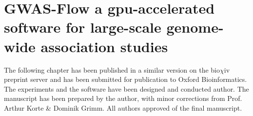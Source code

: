 
\chapter{GWAS-Flow a gpu-accelerated software for large-scale genome-wide association studies}

\label{Chapter3} %


The following chapter has been published in a similar version on the bio$\chi$iv preprint server
\cite{Freudenthal_2019} and has been submitted for publication to Oxford Bioinformatics. The experiments and
the software have been designed and conducted author. The manuscript has been prepared by the author, with
minor corrections from Prof. Arthur Korte \& Dominik Grimm. All authors approved of the final manuscript.


